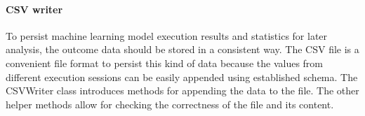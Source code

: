 \paragraph{CSV writer}\label{para:csv-writer}
To persist machine learning model execution results and statistics for later analysis, the outcome data should be stored in a consistent way.
The CSV file is a convenient file format to persist this kind of data because the values from different execution sessions can be easily appended using established schema.
The CSVWriter class introduces methods for appending the data to the file.
The other helper methods allow for checking the correctness of the file and its content.
